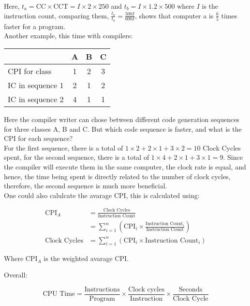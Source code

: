 \documentclass[11pt,a4paper,twocolumn]{book}
\begin{document}
Here, $t_a = \text{CC} \times \text{CCT} = I \times 2 \times 250$ and $t_b = I \times 1.2 \times 500$ where $I$ is the instruction count, comparing them, $\frac{t_a}{t_b} = \frac{500I}{600I}$, shows that computer a is $\frac{6}{5}$ times faster for a program.\\

Another example, this time with compilers:

\begin{table}[ht]
\begin{tabular}{lccc}
 & A & B & C\\
\toprule
CPI for class & 1 & 2 & 3\\
IC in sequence 1 & 2 & 1 & 2\\
IC in sequence 2 & 4 & 1 & 1\\
\bottomrule
\end{tabular}
\end{table}

Here the compiler writer can chose between different code generation sequences for three classes A, B and C. But which code sequence is faster, and what is the CPI for each sequence?\\

For the first sequence, there is a total of $1 \times 2 + 2 \times 1 + 3 \times 2 = 10$ Clock Cycles spent, for the second sequence, there is a total of $1 \times 4 + 2 \times 1 + 3 \times 1 = 9$. Since the compiler will execute them in the same computer, the clock rate is equal, and hence, the time being spent is directly related to the number of clock cycles, therefore, the second sequence is much more beneficial.\\

One could also calulcate the avarage CPI, this is calculated using:

\begin{align}
\text{CPI}_A &= \frac{\text{Clock Cycles}}{\text{Instruction Count}}\\
&= \sum_{i = 1}^n \left( \text{CPI}_i \times \frac{\text{Instruction Count}_i}{\text{Instruction Count}}\right)\\
\text{Clock Cycles} &= \sum_{i =1}^n \left( \text{CPI}_i \times \text{Instruction Count}_i \right)
\end{align}

Where $\text{CPI}_A$ is the weighted avarage CPI.

Overall:

\begin{equation}
\text{CPU Time} = \frac{\text{Instructions}}{\text{Program}} \times \frac{\text{Clock cycles}}{\text{Instruction}} \times \frac{\text{Seconds}}{\text{Clock Cycle}}
\end{equation}
\end{document}
